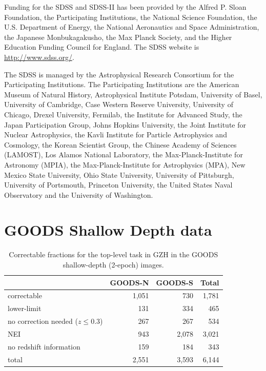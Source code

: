 \documentclass[a4paper,fleqn,usenatbib]{mnras}
\begin{document}
Funding for the SDSS and SDSS-II has been provided by the Alfred P. Sloan
Foundation, the Participating Institutions, the National Science Foundation,
the U.S. Department of Energy, the National Aeronautics and Space
Administration, the Japanese Monbukagakusho, the Max Planck Society, and the
Higher Education Funding Council for England. The SDSS website is
\url{http://www.sdss.org/}. 

The SDSS is managed by the Astrophysical Research Consortium for the
Participating Institutions. The Participating Institutions are the American
Museum of Natural History, Astrophysical Institute Potsdam, University of
Basel, University of Cambridge, Case Western Reserve University, University of
Chicago, Drexel University, Fermilab, the Institute for Advanced Study, the
Japan Participation Group, Johns Hopkins University, the Joint Institute for
Nuclear Astrophysics, the Kavli Institute for Particle Astrophysics and
Cosmology, the Korean Scientist Group, the Chinese Academy of Sciences
(LAMOST), Los Alamos National Laboratory, the Max-Planck-Institute for
Astronomy (MPIA), the Max-Planck-Institute for Astrophysics (MPA), New Mexico
State University, Ohio State University, University of Pittsburgh, University
of Portsmouth, Princeton University, the United States Naval Observatory and
the University of Washington. 




\newpage
\clearpage

\appendix

\section{GOODS Shallow Depth data}


\begin{table}
\caption{Correctable fractions for the top-level task in GZH in the GOODS
shallow-depth (2-epoch) images. \label{tbl:goods_shallow_categories}}
\begin{tabular}{lrr|r}
\hline\hline
                                   & GOODS-N & GOODS-S & Total \\
\hline
correctable                        & 1,051   &   730   & 1,781 \\
lower-limit                        &   131   &   334   &   465 \\
no correction needed ($z \le 0.3$) &   267   &   267   &   534 \\ 
NEI                                &   943   & 2,078   & 3,021 \\
no redshift information            &   159   &   184   &   343 \\
\hline
total                              & 2,551   & 3,593   & 6,144 \\
\hline\hline
\end{tabular}
\end{table}
\end{document}

